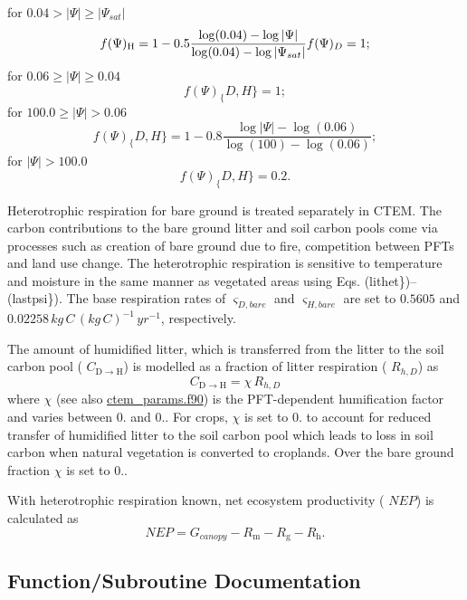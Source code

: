 for $0.04 > \vert\Psi\vert \geq \vert\Psi_{sat}\vert$ \[ f(\Psi)_\mathrm{H} = 1 - 0.5 \frac{\log(0.04)-\log\vert\Psi\vert}{\log(0.04)-\log\vert\Psi_{sat}\vert}\\ f(\Psi)_D = 1\nonumber; \] for $0.06 \geq \vert\Psi\vert \geq 0.04$ \[ f(\Psi)_\{D,H\} = 1; \] for $100.0 \geq \vert\Psi\vert > 0.06$ \[ f(\Psi)_\{D,H\} = 1 - 0.8\frac{\log\vert\Psi\vert-\log(0.06)}{\log(100)-\log(0.06)}; \] for $\vert\Psi\vert > 100.0$ \[ \label{lastpsi} f(\Psi)_\{D,H\}=0.2. \]

Heterotrophic respiration for bare ground is treated separately in C\+T\+E\+M. The carbon contributions to the bare ground litter and soil carbon pools come via processes such as creation of bare ground due to fire, competition between P\+F\+Ts and land use change. The heterotrophic respiration is sensitive to temperature and moisture in the same manner as vegetated areas using Eqs. (lithet\})--(lastpsi\}). The base respiration rates of $\varsigma_{D,bare}$ and $\varsigma_{H,bare}$ are set to $0.5605$ and $0.02258\,kg\,C\,(kg\,C)^{-1}\,yr^{-1}$, respectively.

The amount of humidified litter, which is transferred from the litter to the soil carbon pool ( $C_{\mathrm{D} \rightarrow \mathrm{H}}$) is modelled as a fraction of litter respiration ( $R_{h,D}$) as \[ \label{cdtoh} C_{\mathrm{D} \rightarrow \mathrm{H}} = \chi\,R_{h,D} \] where $\chi$ (see also \hyperlink{ctem__params_8f90}{ctem\+\_\+params.\+f90}) is the P\+F\+T-\/dependent humification factor and varies between 0. and 0.. For crops, $\chi$ is set to 0. to account for reduced transfer of humidified litter to the soil carbon pool which leads to loss in soil carbon when natural vegetation is converted to croplands. Over the bare ground fraction $\chi$ is set to 0..

With heterotrophic respiration known, net ecosystem productivity ( $NEP$) is calculated as \[ NEP = G_{canopy} - R_\mathrm{m} - R_\mathrm{g} - R_\mathrm{h}. \] 

\subsection{Function/\+Subroutine Documentation}
\hypertarget{hetresg_8f_abc05c909fea03987862d6cf0dd3c5a0c}{}
